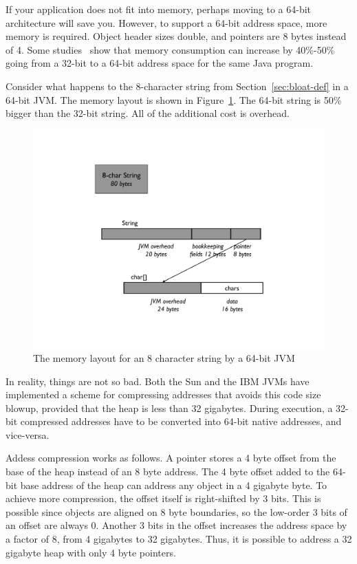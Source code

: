 If your application does not fit into memory, perhaps moving to a 64-bit architecture will save you. However, to support a 64-bit address space, more memory is required. Object header sizes double, and pointers are 8 bytes instead of 4. Some studies~\cite{compressedAddress} show that memory consumption can increase by 40\%-50\% going from a 32-bit to a 64-bit address space for the same Java program.
\begin{example} 
Consider what happens to the 8-character string from Section~\ref{sec:bloat-def} in a 64-bit JVM. The memory layout is shown in Figure~\ref{fig:8-char-string-64-bit}. The 64-bit string is 50\% bigger than the 32-bit string. All of the additional cost is overhead.
\end{example} 
 \begin{figure}
  \centering
 \includegraphics[width=.70\textwidth]{Figures/chapter4/8-char-string-64-bit.pdf}
  \caption{The memory layout for an 8 character string by a 64-bit JVM}
  \label{fig:8-char-string-64-bit}
\end{figure}
In reality, things are not so bad. Both the Sun and the IBM JVMs have implemented a scheme for compressing addresses that avoids this code size blowup, provided that the heap is less than 32 gigabytes. During execution, a 32-bit compressed addresses have to be converted into 64-bit native addresses, and vice-versa. 

Addess compression works as follows. A pointer stores a 4 byte offset from the base of the heap instead of an 8 byte address. The 4 byte offset added to the 64-bit base address of the heap can address any object in a 4 gigabyte byte. To achieve more compression, the offset itself is right-shifted by 3 bits. This is possible since objects are aligned on 8 byte boundaries, so the low-order 3 bits of an offset are always 0. Another 3 bits in the offset increases the address space by a factor of 8, from 4 gigabytes to 32 gigabytes. Thus, it is possible to address a 32 gigabyte heap with only 4 byte pointers.      

